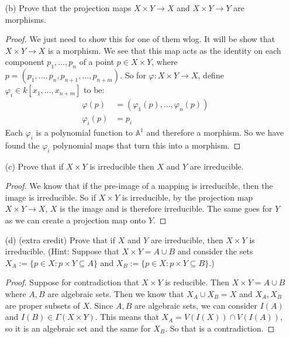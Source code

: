 \documentclass{article}
\begin{document}
\begin{itemize}
        \item [(b)] Prove that the projection maps $X \times Y \rightarrow X$ and $X \times Y \rightarrow Y$ are morphisms.
            \begin{proof}
                We just need to show this for one of them wlog. It will be show that $X \times Y \rightarrow X$ is a morphism. We see that this map acts as the identity on each component $p_{1}, \ldots , p_{n}$ of a point $p \in X \times Y$, where $p = (p_{1}, \ldots , p_{n}, p_{n + 1}, \ldots , p_{n + m})$. So for $\varphi : X \times Y \rightarrow X$, define $\varphi_{i} \in k[x_{1}, \ldots , x_{n + m}]$ to be:
                    \begin{align*}
                        \varphi(p)     &= (\varphi_{1}(p), \ldots , \varphi_{n}(p)) \\
                        \varphi_{i}(p) &= p_{i}                                       
                    \end{align*}
                Each $\varphi_{i}$ is a polynomial function to $\mathbb{A}^{1}$ and therefore a morphism. So we have found the $\varphi_{i}$ polynomial maps that turn this into a morphism.
            \end{proof}

        \item [(c)] Prove that if $X \times Y$ is irreducible then $X$ and $Y$ are irreducible.
            \begin{proof}
                We know that if the pre-image of a mapping is irreducible, then the image is irreducible. So if $X \times Y$ is irreducible, by the projection map $X \times Y \rightarrow X$, $X$ is the image and is therefore irreducible. The same goes for $Y$ as we can create a projection map onto $Y$.
            \end{proof}

        \item [(d)] (extra credit) Prove that if $X$ and $Y$ are irreducible, then $X \times Y$ is irreducible. (Hint: Suppose that $X \times Y = A \cup B$ and consider the sets $X_{A} := \{p \in X : p \times Y \subseteq A\}$ and $X_{B} := \{p \in X : p \times Y \subseteq B\}$.)
            \begin{proof}
                Suppose for contradiction that $X \times Y$ is reducible. Then $X \times Y = A \cup B$ where $A, B$ are algebraic sets. Then we know that $X_{A} \cup X_{B} = X$ and $X_{A}, X_{B}$ are proper subsets of $X$. Since $A, B$ are algebraic sets, we can consider $I(A)$ and $I(B) \in \Gamma(X \times Y)$. This means that $X_{A} = V(I(X)) \cap V(I(A))$, so it is an algebraic set and the same for $X_{B}$. So that is a contradiction.
            \end{proof}
    \end{itemize}
\end{document}
